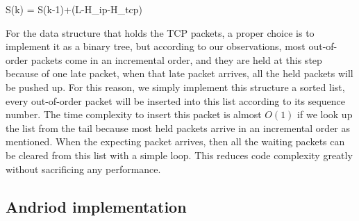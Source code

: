 \be
\label{eq.seq}
S(k) = S(k-1)+(L-H_{ip}-H_{tcp})
\ee

For the data structure that holds the TCP packets, a proper choice is to implement it as a binary tree, but according to our observations, most out-of-order packets come in an incremental order, and they are held at this step because of one late packet, when that late packet arrives, all the held packets will be pushed up. For this reason, we simply implement this structure a sorted list, every out-of-order packet will be inserted into this list according to its sequence number. The time complexity to insert this packet is almost $O(1)$ if we look up the list from the tail because most held packets arrive in an incremental order as mentioned.
When the expecting packet arrives, then all the waiting packets can be cleared from this list with a simple loop. This reduces code complexity greatly without sacrificing any performance.




\subsection{Andriod implementation}
